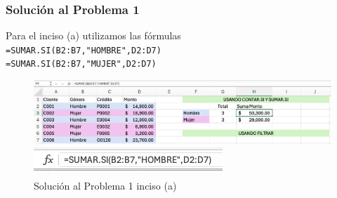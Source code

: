 \documentclass{article}
\begin{document}
\clearpage

\subsubsection*{Solución al Problema 1}

Para el inciso (a) utilizamos las fórmulas
\\[12pt]
\texttt{=SUMAR.SI(B2:B7,"HOMBRE",D2:D7)}
\\[0pt]
\texttt{=SUMAR.SI(B2:B7,"MUJER",D2:D7)}
\begin{figure}[!ht]
    \centering
    \begin{minipage}{\textwidth}
        \centering
        \includegraphics[width=\textwidth]{figures/s101-1a1.png}
    \end{minipage}
    \hfill
    \begin{minipage}{\textwidth}
        \centering
        \includegraphics[width=\textwidth]{figures/s101-1a2.png}
    \end{minipage}
    \captionsetup{width=0.9\textwidth}
    \caption{Solución al Problema 1 inciso (a)}
    \label{fig:s101-1a}
\end{figure}
\end{document}
